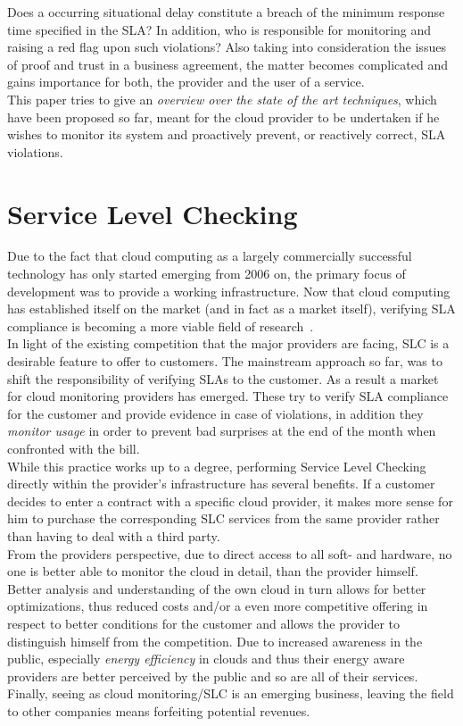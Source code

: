 \documentclass[a4paper]{llncs}
\begin{document}
Does a occurring situational delay constitute a breach of the minimum response time specified in the SLA? In addition, who is responsible for monitoring and raising a red flag upon such violations? Also taking into consideration the issues of proof and trust in a business agreement, the matter becomes complicated and gains importance for both, the provider and the user of a service.\\

This paper tries to give an \textit{overview over the state of the art techniques}, which have been proposed so far, meant for the cloud provider to be undertaken if he wishes to monitor its system and proactively prevent, or reactively correct, SLA violations.\\

\section{Service Level Checking}
Due to the fact that cloud computing as a largely commercially successful technology has only started emerging from 2006 on, the primary focus of development was to provide a working infrastructure. Now that cloud computing has established itself on the market (and in fact as a market itself), verifying SLA compliance is becoming a more viable field of research~\cite{Emeakaroha10a}.\\
In light of the existing competition that the major providers are facing, SLC is a desirable feature to offer to customers. The mainstream approach so far, was to shift the responsibility of verifying SLAs to the customer. As a result a market for cloud monitoring providers has emerged. These try to verify SLA compliance for the customer and provide evidence in case of violations, in addition they \textit{monitor usage} in order to prevent bad surprises at the end of the month when confronted with the bill.\\

While this practice works up to a degree, performing Service Level Checking directly within the provider’s infrastructure has several benefits. If a customer decides to enter a contract with a specific cloud provider, it makes more sense for him to purchase the corresponding SLC services from the same provider rather than having to deal with a third party.\\

From the providers perspective, due to direct access to all soft- and hardware, no one is better able to monitor the cloud in detail, than the provider himself. Better analysis and understanding of the own cloud in turn allows for better optimizations, thus reduced costs and/or a even more competitive offering in respect to better conditions for the customer and allows the provider to distinguish himself from the competition. Due to increased awareness in the public, especially \textit{energy efficiency} in clouds and thus their energy aware providers are better perceived by the public and so are all of their services.\\
Finally, seeing as cloud monitoring/SLC is an emerging business, leaving the field to other companies means forfeiting potential revenues.\\
\end{document}
